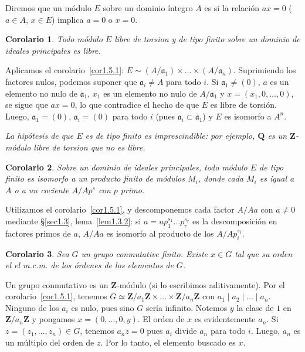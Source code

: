 \documentclass[bibtotoc,leqno,spanish]{amsbook}
\let\emph\relax %
\newcommand{\QQ}{\mathbf{Q}}
\newcommand{\ZZ}{\mathbf{Z}}
\newcommand{\idl}[1]{\mathfrak{#1}}
\numberwithin{equation}{section}
\newenvironment{comm}%
	{\begin{list}{}{\setlength{\leftmargin}{2\parindent}\setlength{\topsep}{\baselineskip}}\item\itshape}
	{\end{list}}
\theoremstyle{note}
\theoremstyle{note}
\newtheorem{corollary}{Corolario}
\theoremstyle{rem}
\numberwithin{theorem}{section}
\numberwithin{proposition}{section}
\numberwithin{definition}{section}
\numberwithin{lemma}{section}
\numberwithin{corollary}{section}
\numberwithin{example}{section}
\numberwithin{footnote}{section}%
\begin{document}
Diremos que un m\'odulo $E$ sobre un dominio \'integro $A$ es
\emph{libre de torsi\'on} si la relaci\'on $ax = 0$
($a\in A$, $x\in E$) implica $a = 0$ o $x = 0$.

\begin{corollary}
Todo m\'odulo $E$ libre de torsion y de tipo finito
sobre un dominio de ideales principales es libre.
\end{corollary}

Aplicamos el corolario~\ref{cor1.5.1}: $E \sim (A/\idl{a}_{1})\times\dots
\times (A/\idl{a}_{n})$. Suprimiendo los factores nulos, podemos
suponer que $\idl{a}_{i}\neq A$ para todo $i$. Si $\idl{a}_{1}\neq(0)$,
$a$ es un elemento no nulo de $\idl{a}_{1}$,
$x_{1}$ es un elemento no nulo de $A/\idl{a}_{1}$ y
$x = (x_{1},0,\dots,0)$, se sigue que $ax = 0$, lo que contradice
el hecho de que $E$ es libre de torsi\'on. Luego,
$\idl{a}_{1} = (0)$, $\idl{a}_{i} = (0)$ para todo $i$ (pues
$\idl{a}_{i}\subset\idl{a}_{1}$) y $E$ es isomorfo a $A^{n}$.

\begin{comm}
La hip\'otesis de que $E$ es de tipo finito es imprescindible:
por ejemplo, $\QQ$ es un $\ZZ$-m\'odulo libre de torsion que no
es libre.
\end{comm}

\begin{corollary}
Sobre un dominio de ideales principales, todo m\'odulo $E$
de tipo finito es isomorfo a un producto finito de m\'odulos
$M_{i}$, donde cada $M_{i}$ es igual a $A$ o a un cociente
$A/Ap^{s}$ con $p$ primo.
\end{corollary}

Utilizamos el corolario~\ref{cor1.5.1}, y descomponemos cada factor
$A/Aa$ con $a\neq 0$ mediante \S\ref{sec1.3}, lema~\ref{lem1.3.2}: si
$a = up_{1}^{s_{1}}\dots p_{r}^{s_{r}}$ es la
descomposici\'on en factores primos de $a$, $A/Aa$ es
isomorfo al producto de los $A/Ap_{i}^{s_{i}}$.

\begin{corollary}\label{cor1.5.4}
Sea $G$ un grupo conmutative finito. Existe $x\in G$ tal que
su orden el el m.c.m. de los \'ordenes de los elementos de $G$.
\end{corollary}

Un grupo conmutativo es un $\ZZ$-m\'odulo (si lo escribimos
aditivamente). Por el corolario~\ref{cor1.5.1}, tenemos $G \simeq
\ZZ/a_{1}\ZZ\times\dots\times\ZZ/a_{n}\ZZ$ con
$a_{1}\mid a_{2}\mid\dots\mid a_{n}$. Ninguno de los $a_{i}$
es nulo, pues sino $G$ ser\'ia infinito. Notemos $y$ la
clase de $1$ en $\ZZ/a_{n}\ZZ$ y pongamos $x = (0,\dots,0,y)$.
El orden de $x$ es evidentemente $a_{n}$. Si $z = (z_{1},\dots,z_{n})\in G$,
tenemos $a_{n}z = 0$ pues $a_{i}$ divide $a_{n}$ para todo $i$.
Luego, $a_{n}$ es un m\'ultiplo del orden de $z$. Por lo tanto, el
elemento buscado es $x$.
\end{document}
